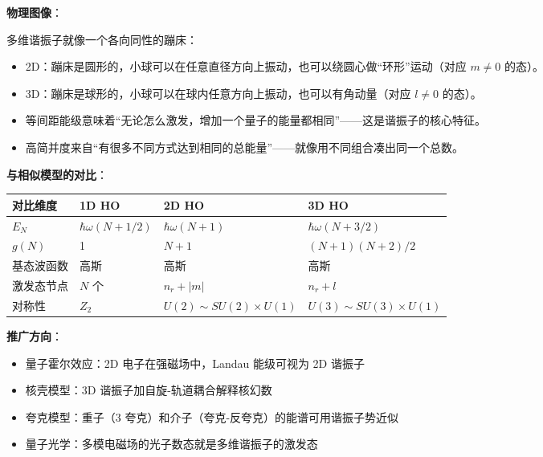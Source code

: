 \begin{insightbox}[物理图像与模型关联]
\textbf{物理图像}：

多维谐振子就像一个各向同性的蹦床：
\begin{itemize}[nosep]
    \item 2D：蹦床是圆形的，小球可以在任意直径方向上振动，也可以绕圆心做``环形''运动（对应 $m\neq0$ 的态）。
    \item 3D：蹦床是球形的，小球可以在球内任意方向上振动，也可以有角动量（对应 $l\neq0$ 的态）。
    \item 等间距能级意味着``无论怎么激发，增加一个量子的能量都相同''——这是谐振子的核心特征。
    \item 高简并度来自``有很多不同方式达到相同的总能量''——就像用不同组合凑出同一个总数。
\end{itemize}

\textbf{与相似模型的对比}：
\begin{center}
\begin{tabular}{llll}
\toprule
\textbf{对比维度} & \textbf{1D HO} & \textbf{2D HO} & \textbf{3D HO} \\
\midrule
$E_N$ & $\hbar\omega(N+1/2)$ & $\hbar\omega(N+1)$ & $\hbar\omega(N+3/2)$ \\
$g(N)$ & 1 & $N+1$ & $(N+1)(N+2)/2$ \\
基态波函数 & 高斯 & 高斯 & 高斯 \\
激发态节点 & $N$ 个 & $n_r+|m|$ & $n_r+l$ \\
对称性 & $Z_2$ & $U(2)\sim SU(2)\times U(1)$ & $U(3)\sim SU(3)\times U(1)$ \\
\bottomrule
\end{tabular}
\end{center}

\textbf{推广方向}：
\begin{itemize}[nosep]
    \item 量子霍尔效应：2D 电子在强磁场中，Landau 能级可视为 2D 谐振子
    \item 核壳模型：3D 谐振子加自旋-轨道耦合解释核幻数
    \item 夸克模型：重子（3 夸克）和介子（夸克-反夸克）的能谱可用谐振子势近似
    \item 量子光学：多模电磁场的光子数态就是多维谐振子的激发态
\end{itemize}
\end{insightbox}

